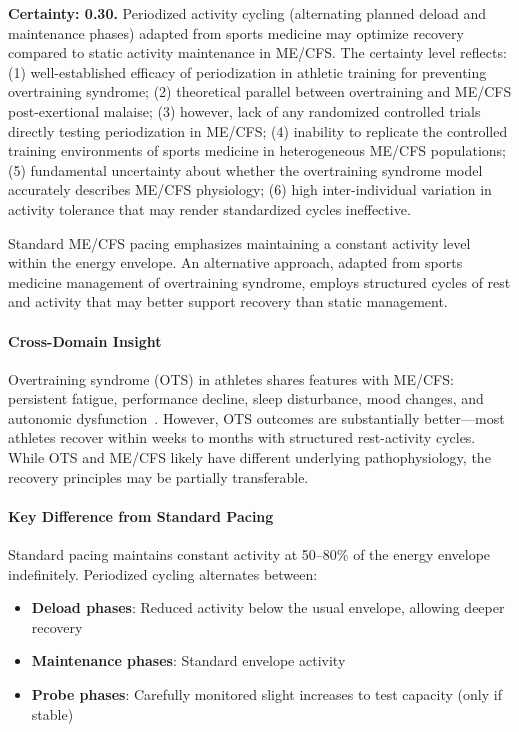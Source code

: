 \begin{protocol}
\label{prot:periodized-activity}

\textbf{Certainty: 0.30.} Periodized activity cycling (alternating planned deload and maintenance phases) adapted from sports medicine may optimize recovery compared to static activity maintenance in ME/CFS. The certainty level reflects: (1) well-established efficacy of periodization in athletic training for preventing overtraining syndrome; (2) theoretical parallel between overtraining and ME/CFS post-exertional malaise; (3) however, lack of any randomized controlled trials directly testing periodization in ME/CFS; (4) inability to replicate the controlled training environments of sports medicine in heterogeneous ME/CFS populations; (5) fundamental uncertainty about whether the overtraining syndrome model accurately describes ME/CFS physiology; (6) high inter-individual variation in activity tolerance that may render standardized cycles ineffective.

Standard ME/CFS pacing emphasizes maintaining a constant activity level within the energy envelope. An alternative approach, adapted from sports medicine management of overtraining syndrome, employs structured cycles of rest and activity that may better support recovery than static management.

\paragraph{Cross-Domain Insight}
Overtraining syndrome (OTS) in athletes shares features with ME/CFS: persistent fatigue, performance decline, sleep disturbance, mood changes, and autonomic dysfunction~\cite{Meeusen2013overtraining}. However, OTS outcomes are substantially better---most athletes recover within weeks to months with structured rest-activity cycles. While OTS and ME/CFS likely have different underlying pathophysiology, the recovery principles may be partially transferable.

\paragraph{Key Difference from Standard Pacing}
Standard pacing maintains constant activity at 50--80\% of the energy envelope indefinitely. Periodized cycling alternates between:
\begin{itemize}
    \item \textbf{Deload phases}: Reduced activity below the usual envelope, allowing deeper recovery
    \item \textbf{Maintenance phases}: Standard envelope activity
    \item \textbf{Probe phases}: Carefully monitored slight increases to test capacity (only if stable)
\end{itemize}


\end{protocol}
